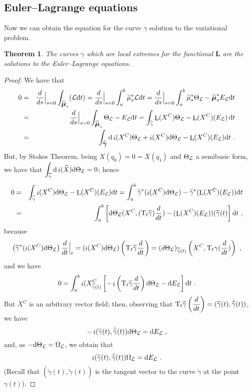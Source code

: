 \documentclass[12pt]{report}
\newtheorem{teor}{Theorem}[chapter]
\def\dst{\displaystyle}
\def\Lag{{\cal L}}
\def\d{{\rm d}}
\def\Tan{{\rm T}}
\def\Lie{\mathop{\rm L}\nolimits}
\def\inn{\mathop{i}\nolimits}
\begin{document}
\subsection{Euler--Lagrange equations}


Now we can obtain the equation for the curve $\gamma$ solution to the variational problem. 

\begin{teor}
The curves $\gamma$ which are local extremes for the functional ${\mathbf L}$
are the solutions to the Euler--Lagrange equations.
\label{hamprinc}
\end{teor}
\begin{proof}
We have that
\begin{eqnarray*}
0 &=&
\frac{d}{d s}\Big\vert_{s=0}\int_{\widehat{\mbox{\boldmath$\mu$}}_s}(\Lag \d t )
=
\frac{d}{d s}\Big\vert_{s=0}\int_a^b\widetilde  \mu_s^*\Lag \d t
=
\frac{d}{d s}\Big\vert_{s=0}
\int_a^b\widetilde{\mu}_s^*\Theta_\Lag -\widehat{\mbox{\boldmath$\mu$}}_s^*E_\Lag\d t
\\ 
&=&
\frac{d}{d s}\Big\vert_{s=0}\int_{\widehat{\mbox{\boldmath$\mu$}}_s}\Theta_\Lag -E_\Lag\d t =
\int_{\widetilde{\gamma}}\Lie (X^C)\Theta_\Lag -\Lie(X^C)(E_\Lag )\,\d t
\\
&=&
\int_{\widehat{\mbox{\boldmath$\gamma$}}}\d\inn (X^C)\Theta_\Lag +
\inn (X^C)\d\Theta_\Lag -\Lie(X^C)(E_\Lag )\d t \ .
\end{eqnarray*}
But, by Stokes Theorem, being
$X(q_0)=0=X(q_1)$ and $\Theta_\Lag$ a semibasic form, we have that 
\(\dst \int_{\widetilde  \gamma}\d\inn (\widetilde  X)\d\Theta_\Lag =0 \); hence
\begin{eqnarray*}
0 &=&
\int_{\widetilde{\gamma}}\inn (X^C)\d\Theta_\Lag -\Lie(X^C)(E_\Lag )\d t
=\int_a^b\widetilde  \gamma^*(\inn (X^C)\d\Theta_\Lag ) -
\widetilde  \gamma^*(\Lie(X^C)(E_\Lag ))\d t
\\ &=&
\int_a^b\left[\d\Theta_\Lag (X^C,(\Tan_t\widetilde  \gamma)\frac{d}{d t})-
(\Lie(X^C)(E_\Lag ))(\widetilde\gamma (t)\right]\d t \ ,
\end{eqnarray*}
because
$$
\left(\widetilde  \gamma^*(\inn (X^C)\d\Theta_\Lag \right)\frac{d}{d t}\Big\vert_t
=(\inn (X^C)\d\Theta_\Lag )\left(\Tan_t\widetilde  \gamma\frac{d}{d t}\right)
=(d\Theta_\Lag )_{\widetilde\gamma (t)}
\left(X^C,\Tan_t\gamma(\frac{d}{d t})\right) \ ,
$$
and we have
$$
0=\int_a^b\inn (X^C_{\widetilde\gamma (t)}
\left[ -\inn \left(\Tan_t\widetilde  \gamma\frac{d}{d t}\right)\d\Theta_\Lag -
\d E_\Lag\right]\d t \ .
$$
But $X^C$ is an arbitrary vector field; then, observing that
\(\dst
\Tan_t\widetilde\gamma\left(\frac{d}{d t}\right)=(\widetilde  \gamma (t),\dot{\widetilde  \gamma} (t))\),
we have
$$
-\inn (\widetilde  \gamma (t),\dot{\widetilde  \gamma} (t))\d\Theta_\Lag = \d E_\Lag \ ,
$$
and, as $-\d\Theta_\Lag =\Omega_\Lag$, we obtain that
$$
\inn (\widetilde  \gamma (t),\dot{\widetilde  \gamma} (t))\Omega_\Lag = \d E_\Lag \ .
$$
(Recall that 
$(\widetilde  \gamma (t),\dot{\widetilde  \gamma} (t))$
is the tangent vector to the curve $\widetilde  \gamma$ at the point $\gamma(t)$).


\end{proof}
\end{document}
